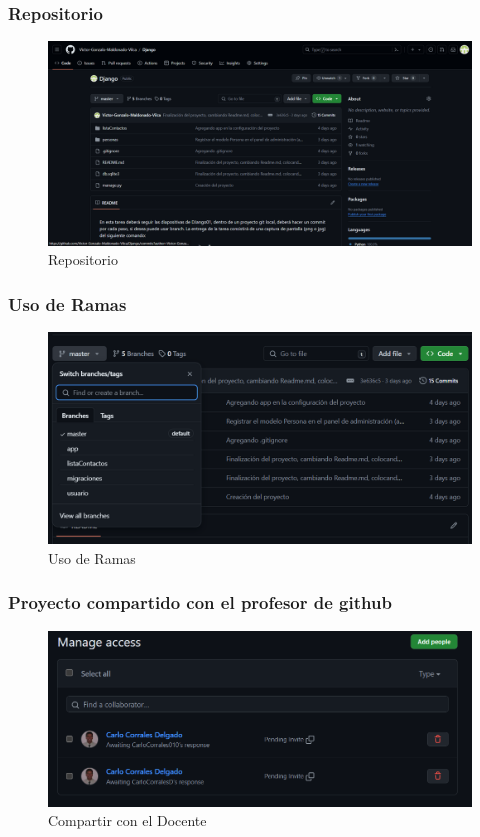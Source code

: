 \documentclass{article}
\begin{document}
	\subsubsection{Repositorio}
  \begin{figure}[H]
    \centering
    \includegraphics[width=1\textwidth, keepaspectratio]{img/repo.png}
    \caption{Repositorio}
  \end{figure}
  

	\subsubsection{Uso de Ramas}
  \begin{figure}[H]
    \centering
    \includegraphics[width=1\textwidth, keepaspectratio]{img/ramas.png}
    \caption{Uso de Ramas}
  \end{figure}
  \newpage


	\subsubsection{Proyecto compartido con el profesor de github}
  \begin{figure}[H]
    \centering
    \includegraphics[width=1\textwidth, keepaspectratio]{img/compartir.png}
    \caption{Compartir con el Docente}
  \end{figure}
  
\end{document}
